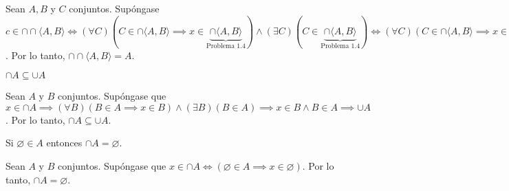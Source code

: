 \begin{dem}
	Sean $A,B$ y $C$ conjuntos. Supóngase $c\in\cap \cap \langle A, B\rangle \iff (\forall C)(C\in\cap \langle A, B\rangle \implies x\in  \underbrace{\cap \langle A, B\rangle}_{\text{Problema 1.4}})\wedge (\exists C)(C\in \underbrace{\cap \langle A, B\rangle}_{\text{Problema 1.4}} ) \iff (\forall C)(C\in\cap \langle A, B\rangle \implies x\in \{A\})\wedge (\exists C)(C\in \{A\} )\iff (\forall C)(C\in\cap \langle A, B\rangle \implies x\in \{A\})\wedge (C=A )\iff x\in A$. Por lo tanto, $\cap \cap \langle A, B\rangle=A$.
\end{dem}
\begin{problema}
	$\cap A \subseteq \cup A$
\end{problema}

\begin{dem}
	Sean $A$ y $B$ conjuntos. Supóngase que $x\in \cap A\implies (\forall B)(B\in A \implies x\in B)\wedge (\exists B)(B\in A)\implies x\in B\wedge B\in A\implies \cup A$. Por lo tanto, $\cap A \subseteq \cup A$.
\end{dem}
\begin{problema}
	Si $\varnothing\in A$ entonces $\cap A=\varnothing$. 
\end{problema}

\begin{dem}
	Sean $A$ y $B$ conjuntos. Supóngase que $x\in \cap A\iff (\varnothing\in A \implies x \in\varnothing)$. Por lo tanto, $\cap A=\varnothing$.
\end{dem}





